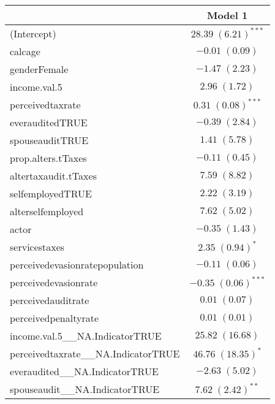 
\begin{table}
\begin{tabular}{l c }
\hline
 & Model 1 \\
\hline
(Intercept)                                        & $28.39 \; (6.21)^{***}$ \\
calcage                                            & $-0.01 \; (0.09)$       \\
genderFemale                                       & $-1.47 \; (2.23)$       \\
income.val.5                                       & $2.96 \; (1.72)$        \\
perceivedtaxrate                                   & $0.31 \; (0.08)^{***}$  \\
everauditedTRUE                                    & $-0.39 \; (2.84)$       \\
spouseauditTRUE                                    & $1.41 \; (5.78)$        \\
prop.alters.tTaxes                                 & $-0.11 \; (0.45)$       \\
altertaxaudit.tTaxes                               & $7.59 \; (8.82)$        \\
selfemployedTRUE                                   & $2.22 \; (3.19)$        \\
alterselfemployed                                  & $7.62 \; (5.02)$        \\
actor                                              & $-0.35 \; (1.43)$       \\
servicestaxes                                      & $2.35 \; (0.94)^{*}$    \\
perceivedevasionratepopulation                     & $-0.11 \; (0.06)$       \\
perceivedevasionrate                               & $-0.35 \; (0.06)^{***}$ \\
perceivedauditrate                                 & $0.01 \; (0.07)$        \\
perceivedpenaltyrate                               & $0.01 \; (0.01)$        \\
income.val.5\_\_NA.IndicatorTRUE                   & $25.82 \; (16.68)$      \\
perceivedtaxrate\_\_NA.IndicatorTRUE               & $46.76 \; (18.35)^{*}$  \\
everaudited\_\_NA.IndicatorTRUE                    & $-2.63 \; (5.02)$       \\
spouseaudit\_\_NA.IndicatorTRUE                    & $7.62 \; (2.42)^{**}$   \\

\end{tabular}
\end{table}

